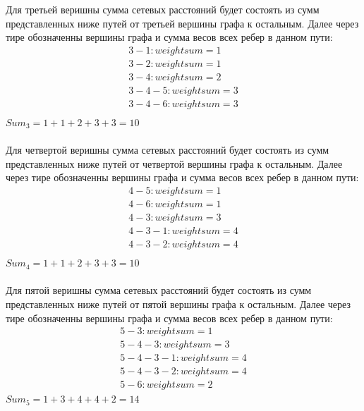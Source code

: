 \documentclass[12pt]{article}
\begin{document}
Для третьей веришны сумма сетевых расстояний будет состоять из сумм представленных ниже 
путей от третьей вершины графа к остальным.
Далее через тире обозначенны вершины графа и сумма весов всех ребер в данном пути:
\begin{gather}
3 - 1 : weight sum = 1 \\
3 - 2 : weight sum = 1 \\
3 - 4 : weight sum = 2 \\
3 - 4 - 5 : weight sum = 3 \\
3 - 4 - 6 : weight sum = 3 \\
\end{gather}
$Sum_3 = 1 + 1 + 2 + 3 + 3 = 10$

\paragraph{}

Для четвертой веришны сумма сетевых расстояний будет состоять из сумм представленных ниже 
путей от четвертой вершины графа к остальным.
Далее через тире обозначенны вершины графа и сумма весов всех ребер в данном пути:
\begin{gather}
4 - 5 : weight sum = 1 \\
4 - 6 : weight sum = 1 \\
4 - 3 : weight sum = 3 \\
4 - 3 - 1 : weight sum = 4 \\
4 - 3 - 2 : weight sum = 4 \\
\end{gather}
$Sum_4 = 1 + 1 + 2 + 3 + 3 = 10$

\paragraph{}

Для пятой веришны сумма сетевых расстояний будет состоять из сумм представленных ниже 
путей от пятой вершины графа к остальным.
Далее через тире обозначенны вершины графа и сумма весов всех ребер в данном пути:
\begin{gather}
5 - 3 : weight sum = 1 \\
5 - 4 - 3 : weight sum = 3 \\
5 - 4 - 3 - 1 : weight sum = 4 \\
5 - 4 - 3 - 2 : weight sum = 4 \\
5 - 6 : weight sum = 2
\end{gather}
$Sum_5 = 1 + 3 + 4 + 4 + 2 = 14$
\end{document}
